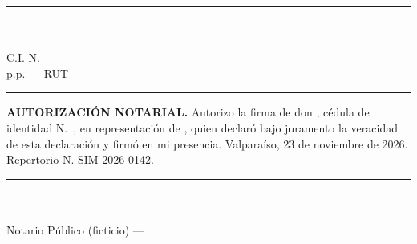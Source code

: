 \documentclass[11pt]{article}
\begin{document}
\vspace{12pt}
\begin{center}
  \rule{7cm}{0.5pt}\\
  \textbf{\LFXrepresentante}\\
  C.I. N.\textdegree~\SIMrunrepresentante\\
  p.p. \LFXempresa{} --- RUT \LFXrut
\end{center}

\vspace{8pt}
\noindent\rule{\linewidth}{0.4pt}\par\smallskip
\noindent\begin{minipage}[t]{0.68\linewidth}\small
  \textbf{AUTORIZACIÓN NOTARIAL.} Autorizo la firma de don \textbf{\LFXrepresentante}, cédula de identidad N.\textdegree~\SIMrunrepresentante, en representación de \LFXempresa, quien declaró bajo juramento la veracidad de esta declaración y firmó en mi presencia. Valparaíso, 23 de noviembre de 2026. Repertorio N.\textdegree{} SIM-2026-0142.

  \vspace{14pt}
  \rule{6cm}{0.4pt}\\
  \SIMnotarioTitular\\ Notario Público (ficticio) --- \SIMnotaria\\ \SIMnotariaDir
\end{minipage}\hfill
\begin{minipage}[t]{2.8cm}\raggedleft{}\end{minipage}
\end{document}
